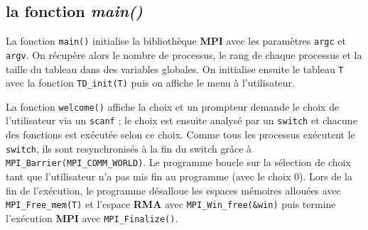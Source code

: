 \subsection*{la fonction \textit{main()}}

La fonction \verb+main()+ initialise la bibliothèque \textbf{MPI} avec les paramètres \verb+argc+ et \verb+argv+. On récupère alors le nombre de processus, le rang de chaque processus et la taille du tableau dans des variables globales. On initialise ensuite le tableau \verb+T+ avec la fonction \verb+TD_init(T)+ puis on affiche le menu à l'utilisateur.



La fonction \verb+welcome()+ affiche la choix et un prompteur demande le choix de l'utilisateur via un \verb+scanf+ ; le choix est ensuite analysé par un \verb+switch+ et chacune des fonctions est exécutée selon ce choix. Comme tous les processus exécutent le \verb+switch+, ils sont resynchronisés à la fin du switch grâce à \verb+MPI_Barrier(MPI_COMM_WORLD)+. Le programme boucle sur la sélection de choix tant que l'utilisateur n'a pas mis fin au programme (avec le choix $0$). Lors de la fin de l'exécution, le programme désalloue les espaces mémoires allouées avec \verb+MPI_Free_mem(T)+ et l'espace \textbf{RMA} avec \verb+MPI_Win_free(&win)+ puis termine l'exécution \textbf{MPI} avec \verb+MPI_Finalize()+.
